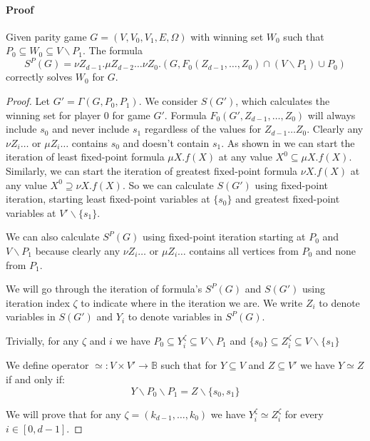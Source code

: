 \paragraph{Proof}
\begin{theorem}
	\label{the_formula_cupP0_etc_is_correct}
	Given parity game $G = (V,V_0,V_1,E,\Omega)$ with winning set $W_0$ such that $P_0\subseteq W_0 \subseteq V\backslash P_1$. The formula 
	\[ S^P(G) = \nu Z_{d-1}.\mu Z_{d-2}\dots \nu Z_0.(G,F_0(Z_{d-1},\dots,Z_0) \cap (V\backslash P_1) \cup P_0) \]
	correctly solves $W_0$ for $G$.
	\begin{proof}
		Let $G' = \Gamma(G,P_0,P_1)$. We consider $S(G')$, which calculates the winning set for player $0$ for game $G'$. Formula $F_0(G',Z_{d-1},\dots,Z_0)$ will always include $s_0$ and never include $s_1$ regardless of the values for $Z_{d-1} \dots Z_0$. Clearly any $\nu Z_i\dots$ or $\mu Z_i\dots$ contains $s_0$ and doesn't contain $s_1$. As shown in \cite{Emerson:1986:MCP:900378} we can start the iteration of least fixed-point formula $\mu X.f(X)$ at any value $X^0 \subseteq \mu  X.f(X)$. Similarly, we can start the iteration of greatest fixed-point formula $\nu X.f(X)$ at any value $X^0 \supseteq \nu X.f(X)$. So we can calculate $S(G')$ using fixed-point iteration, starting least fixed-point variables at $\{s_0\}$ and greatest fixed-point variables at $V'\backslash \{s_1\}$.
		
		We can also calculate $S^P(G)$ using fixed-point iteration starting at $P_0$ and $V\backslash P_1$ because clearly any $\nu Z_i \dots$ or $\mu Z_i\dots$ contains all vertices from $P_0$ and none from $P_1$.
		
		We will go through the iteration of formula's $S^P(G)$ and $S(G')$ using iteration index $\zeta$ to indicate where in the iteration we are. We write $Z_i$ to denote variables in $S(G')$ and $Y_i$ to denote variables in $S^P(G)$. 
		
		Trivially, for any $\zeta$ and $i$ we have $P_0 \subseteq Y_i^{\zeta} \subseteq V\backslash P_1$ and $\{s_0\} \subseteq Z_i^\zeta\subseteq V\backslash \{s_1\}$
		
		
		We define operator $\simeq : V \times V' \rightarrow \mathbb{B}$ such that for $Y \subseteq V$ and $Z \subseteq V'$ we have $Y \simeq Z$ if and only if:
		\[ Y \backslash P_0 \backslash P_1 = Z \backslash \{s_0,s_1\}\]
		
		We will prove that for any $\zeta = (k_{d-1},\dots,k_0)$ we have $Y_i^{\zeta} \simeq Z_i^{\zeta}$ for every $i \in [0,d-1]$.
		

\end{proof}
\end{theorem}
